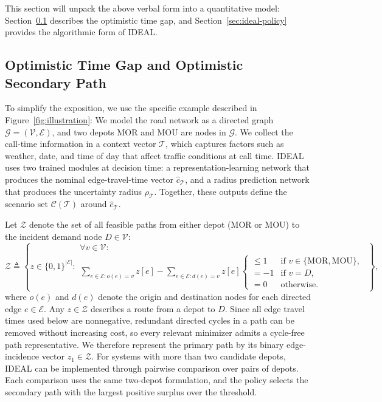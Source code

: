 \documentclass[11pt, letterpaper, oneside, reqno]{amsart}
\newcommand{\Let}{\triangleq}
\begin{document}
This section will unpack the above verbal form into a quantitative model: Section~\ref{sec:optimistic-time-gap} describes the optimistic time gap, and Section~\ref{sec:ideal-policy} provides the algorithmic form of IDEAL.

\subsection{Optimistic Time Gap and Optimistic Secondary Path} \label{sec:optimistic-time-gap}

To simplify the exposition, we use the specific example described in Figure~\ref{fig:illustration}: We model the road network as a directed graph $\mathcal G = (\mathcal V,\mathcal E)$, and two depots $\mathrm{MOR}$ and $\mathrm{MOU}$ are nodes in $\mathcal G$. We collect the call-time information in a context vector $\mathcal T$, which captures factors such as weather, date, and time of day that affect traffic conditions at call time. IDEAL uses two trained modules at decision time: a representation-learning network that produces the nominal edge-travel-time vector $\hat c_{\mathcal T}$, and a radius prediction network that produces the uncertainty radius $\rho_{\mathcal T}$. Together, these outputs define the scenario set $\mathcal C(\mathcal T)$ around $\hat c_{\mathcal T}$.

Let $\mathcal Z$ denote the set of all feasible paths from either depot (MOR or MOU) to the incident demand node $D \in \mathcal V$:
\[
\mathcal Z \Let \left\{
    z \in \{0, 1\}^{|\mathcal E|}: 
    \begin{array}{l}
    \forall v \in \mathcal V: \\[0.5ex]
    \displaystyle
    \sum_{e \in \mathcal E: o(e) = v} z[e] - \sum_{e \in \mathcal E: d(e) = v} z[e]  \begin{cases}
        \le 1 & \text{if } v\in\{\mathrm{MOR},\mathrm{MOU}\}, \\
        = -1 & \text{if } v = D, \\
        = 0 & \text{otherwise.}
    \end{cases}
    \end{array}
\right\},
\]
where $o(e)$ and $d(e)$ denote the origin and destination nodes for each directed edge $e \in \mathcal E$. 
Any $z \in \mathcal Z$ describes a route from a depot to $D$. Since all edge travel times used below are nonnegative, redundant directed cycles in a path can be removed without increasing cost, so every relevant minimizer admits a cycle-free path representative. We therefore represent the primary path by its binary edge-incidence vector $z_1 \in \mathcal Z$.
For systems with more than two candidate depots, IDEAL can be implemented through pairwise comparison over pairs of depots. Each comparison uses the same two-depot formulation, and the policy selects the secondary path with the largest positive surplus over the threshold.
\end{document}
